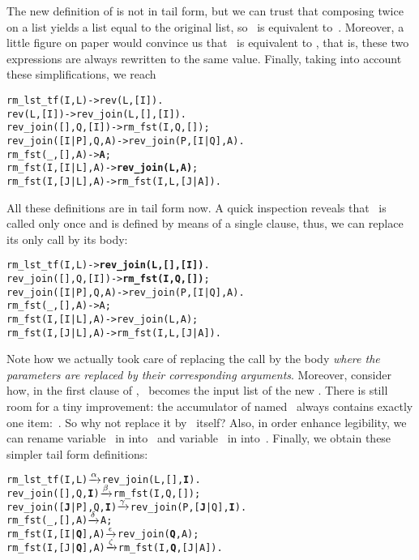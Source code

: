 The new definition of  is not in tail form, but we
can trust that composing twice~ on a list yields a list
equal to the original list, so ~is equivalent
to~. Moreover, a little figure on paper would convince us
that ~is equivalent to
, that is, these two expressions are always
rewritten to the same value. Finally, taking into account these
simplifications, we reach
\begin{alltt}
rm_lst_tf(I,L)        -> rev(L,[I]).
rev(L,[I])            -> rev_join(L,[],[I]).
rev_join(   [],Q,[I]) -> rm_fst(I,Q,[]);
rev_join([I|P],Q,  A) -> rev_join(P,[I|Q],A).
rm_fst(_,   [],A)     -> \textbf{A};\hfill% \emph{Algebraic simplification}
rm_fst(I,[I|L],A)     -> \textbf{rev_join(L,A)};\hfill% \emph{Idem}
rm_fst(I,[J|L],A)     -> rm_fst(I,L,[J|A]).
\end{alltt}
All these definitions are in tail form now. A quick inspection reveals
that ~is called only once and is defined by means of a
single clause, thus, we can replace its only call by its body:
\begin{alltt}
rm_lst_tf(I,L)        -> \textbf{rev_join(L,[],[I])}.
rev_join(   [],Q,[I]) -> \textbf{rm_fst(I,Q,[])};
rev_join([I|P],Q,  A) -> rev_join(P,[I|Q],A).
rm_fst(_,   [],A)     -> A;
rm_fst(I,[I|L],A)     -> rev_join(L,A);
rm_fst(I,[J|L],A)     -> rm_fst(I,L,[J|A]).
\end{alltt}
Note how we actually took care of replacing the call by the body
\emph{where the parameters are replaced by their corresponding
  arguments}. Moreover, consider how, in the first clause of
, ~becomes the input list of the new
. There is still room for a tiny improvement: the
accumulator of  named~ always contains
exactly one item:~. So why not replace it by~
itself? Also, in order enhance legibility, we can rename
variable~ in  into~ and
variable~ in 
into~. Finally, we obtain these simpler tail form
definitions:\label{code:rm_lst_tf}
\begin{alltt}
rm_lst_tf(I,L)      \(\smashedrightarrow{\alpha}\) rev_join(L,[],\textbf{I}).
rev_join(   [],Q,\textbf{I}) \(\smashedrightarrow{\beta}\) rm_fst(I,Q,[]);
rev_join([\textbf{J}|P],Q,\textbf{I}) \(\smashedrightarrow{\gamma}\) rev_join(P,[\textbf{J}|Q],\textbf{I}).
rm_fst(_,   [],A)   \(\smashedrightarrow{\delta}\) A;
rm_fst(I,[I|\textbf{Q}],A)   \(\smashedrightarrow{\epsilon}\) rev_join(\textbf{Q},A);
rm_fst(I,[J|\textbf{Q}],A)   \(\smashedrightarrow{\zeta}\) rm_fst(I,\textbf{Q},[J|A]).
\end{alltt}

